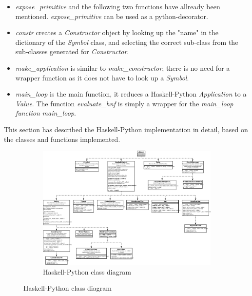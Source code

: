 \begin{itemize}

\item \emph{expose\_primitive} and the following two functions have allready been 
mentioned. \emph{expose\_primitive} can be used as a python-decorator.

\item \emph{constr} creates a \emph{Constructor} object by looking up the "name" in
the dictionary of the \emph{Symbol} class, and selecting the correct sub-class from the
sub-classes generated for \emph{Constructor}.

\item \emph{make\_application} is similar to \emph{make\_constructor}, there is no
need for a wrapper function as it does not have to look up a \emph{Symbol}.

\item \emph{main\_loop} is the main function, it reduces a Haskell-Python 
\emph{Application} to a \emph{Value}. The function \emph{evaluate\_hnf} is
simply a wrapper for the \emph{main\_loop function}
\emph{main\_loop}.

\end{itemize}

This section has described the Haskell-Python implementation in detail, based
on the classes and functions implemented.

\begin{figure}
\begin{figure}[H]
\centering
\includegraphics[width=\textheight]{../diags/core-interp.pdf}

\caption{Haskell-Python class diagram}
\label{fig:coreinterp}

\end{figure}
\end{figure}

